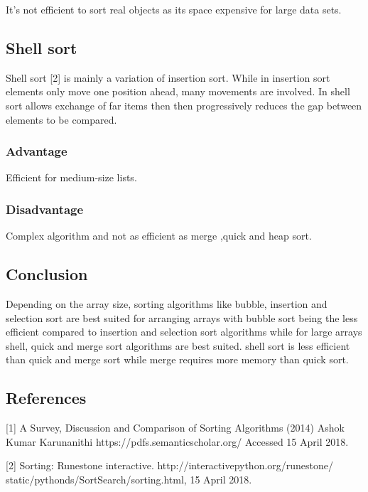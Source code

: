 \documentclass{article}
\begin{document}
	It's not efficient to sort real objects as its space expensive for large data sets.
	
\subsection{Shell sort}
	Shell sort [2] is mainly a variation of insertion sort. While in insertion sort elements only move one position ahead, many movements are involved. In shell sort allows exchange of far items then then progressively reduces the gap between elements to be compared.
	
\subsubsection{Advantage}
	Efficient for medium-size lists.

\subsubsection{Disadvantage}
	Complex algorithm and not as efficient as merge ,quick and heap sort.
	
\subsection{Conclusion}
	Depending on the array size, sorting algorithms like bubble, insertion and selection sort are best suited for arranging arrays with bubble sort being the less efficient compared to insertion and selection sort algorithms while for large arrays shell, quick and merge sort algorithms are best suited. shell sort is less efficient than quick and merge sort while merge requires more memory than quick sort.

\subsection{References}
	[1] A Survey, Discussion and Comparison of Sorting Algorithms (2014) Ashok Kumar Karunanithi  https://pdfs.semanticscholar.org/ Accessed 15 April 2018.
	
	[2] Sorting: Runestone interactive. http://interactivepython.org/runestone/
	static/pythonds/SortSearch/sorting.html, 15 April 2018.
	
\end{document}
